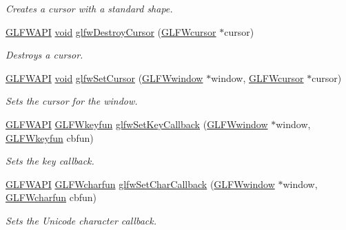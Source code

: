 \begin{DoxyCompactItemize}
\begin{DoxyCompactList}\small\item\em Creates a cursor with a standard shape. \end{DoxyCompactList}\item 
\hyperlink{glfw3_8h_a56da5036b2cc259351ae22fd6439bb47}{G\+L\+F\+W\+A\+P\+I} \hyperlink{wglew_8h_aeea6e3dfae3acf232096f57d2d57f084}{void} \hyperlink{group__input_ga27556b7122117bc1bbb4bb3cc003ea43}{glfw\+Destroy\+Cursor} (\hyperlink{glfw3_8h_a89261ae18c75e863aaf2656ecdd238f4}{G\+L\+F\+Wcursor} $\ast$cursor)
\begin{DoxyCompactList}\small\item\em Destroys a cursor. \end{DoxyCompactList}\item 
\hyperlink{glfw3_8h_a56da5036b2cc259351ae22fd6439bb47}{G\+L\+F\+W\+A\+P\+I} \hyperlink{wglew_8h_aeea6e3dfae3acf232096f57d2d57f084}{void} \hyperlink{group__input_gafaf103cea2f43530cff7de4e01126a4f}{glfw\+Set\+Cursor} (\hyperlink{group__window_ga3c96d80d363e67d13a41b5d1821f3242}{G\+L\+F\+Wwindow} $\ast$window, \hyperlink{glfw3_8h_a89261ae18c75e863aaf2656ecdd238f4}{G\+L\+F\+Wcursor} $\ast$cursor)
\begin{DoxyCompactList}\small\item\em Sets the cursor for the window. \end{DoxyCompactList}\item 
\hyperlink{glfw3_8h_a56da5036b2cc259351ae22fd6439bb47}{G\+L\+F\+W\+A\+P\+I} \hyperlink{group__input_ga0192a232a41e4e82948217c8ba94fdfd}{G\+L\+F\+Wkeyfun} \hyperlink{group__input_gaa73bb92f628a2a0be9c132d56f19362c}{glfw\+Set\+Key\+Callback} (\hyperlink{group__window_ga3c96d80d363e67d13a41b5d1821f3242}{G\+L\+F\+Wwindow} $\ast$window, \hyperlink{group__input_ga0192a232a41e4e82948217c8ba94fdfd}{G\+L\+F\+Wkeyfun} cbfun)
\begin{DoxyCompactList}\small\item\em Sets the key callback. \end{DoxyCompactList}\item 
\hyperlink{glfw3_8h_a56da5036b2cc259351ae22fd6439bb47}{G\+L\+F\+W\+A\+P\+I} \hyperlink{group__input_gabf24451c7ceb1952bc02b17a0d5c3e5f}{G\+L\+F\+Wcharfun} \hyperlink{group__input_ga07b2959b23dc3e466ce7475746021002}{glfw\+Set\+Char\+Callback} (\hyperlink{group__window_ga3c96d80d363e67d13a41b5d1821f3242}{G\+L\+F\+Wwindow} $\ast$window, \hyperlink{group__input_gabf24451c7ceb1952bc02b17a0d5c3e5f}{G\+L\+F\+Wcharfun} cbfun)
\begin{DoxyCompactList}\small\item\em Sets the Unicode character callback. \end{DoxyCompactList}\item 

\end{DoxyCompactItemize}
